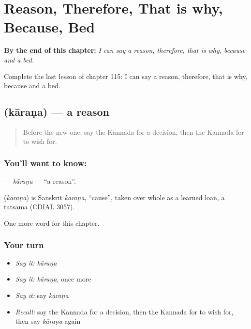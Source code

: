 
\chapter{Reason, Therefore, That is why, Because, Bed}
\label{ch:ka-reason-therefore-that-is-why-because-bed}

\begin{chapteropening}
\textbf{By the end of this chapter:} \emph{I can say a reason, therefore, that is why, because and a bed.}

Complete the last lesson of chapter 115: I can say a reason, therefore, that is why, because and a bed.
\end{chapteropening}

\section[\texorpdfstring{\kn{ಕಾರಣ} (kāraṇa)}{ಕಾರಣ (kāraṇa)}]{ (kāraṇa) — a reason}

\label{lesson:KA-C115-karana}



\begin{quote}
Before the new one: say the Kannada for a decision, then the Kannada for to wish for.
\end{quote}

\subsection*{You'll want to know: }
\textbf{} — \emph{kāraṇa} — \textquotedblleft{}a reason\textquotedblright{}.

\begin{cousinweb}
\textbf{} (\emph{kāraṇa}) is Sanskrit \emph{kāraṇa}, \textquotedblleft{}cause\textquotedblright{}, taken over whole as a learned loan, a tatsama (CDIAL 3057).
\end{cousinweb}

\begin{grammarlens}[title={What you've built}]
One more word for this chapter.
\end{grammarlens}

\subsection*{Your turn}
\begin{itemize}
\raggedright
  \item \emph{Say it:} \emph{kāraṇa}
  \item \emph{Say it:} \emph{kāraṇa}, once more
  \item \emph{Say it:} say \emph{kāraṇa}
  \item \emph{Recall:} say the Kannada for a decision, then the Kannada for to wish for, then say \emph{kāraṇa} again
\end{itemize}

